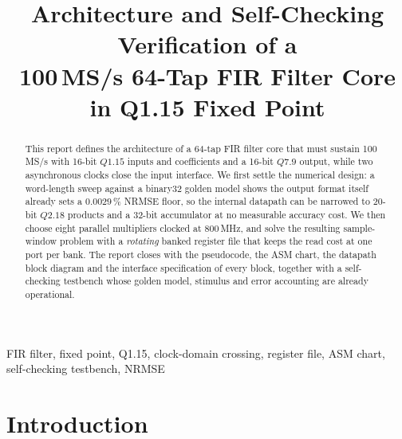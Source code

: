\documentclass[conference]{IEEEtran}
\newcommand{\qf}[2]{Q#1.#2}
\begin{document}
\title{Architecture and Self-Checking Verification of a\\
100\,MS/s 64-Tap FIR Filter Core in Q1.15 Fixed Point}

\author{
}

\maketitle

\begin{abstract}
This report defines the architecture of a 64-tap FIR filter core that must
sustain 100\,MS/s with 16-bit $\qf{1}{15}$ inputs and coefficients and a 16-bit
$\qf{7}{9}$ output, while two asynchronous clocks close the input interface.
We first settle the numerical design: a word-length sweep against a
binary32 golden model shows the output format itself already sets a
$0.0029\,\%$ NRMSE floor, so the internal datapath can be narrowed to 20-bit
$\qf{2}{18}$ products and a 32-bit accumulator at no measurable accuracy cost.
We then choose eight parallel multipliers clocked at 800\,MHz, and solve the
resulting sample-window problem with a \emph{rotating} banked register file
that keeps the read cost at one port per bank.
The report closes with the pseudocode, the ASM chart, the datapath block
diagram and the interface specification of every block, together with a
self-checking testbench whose golden model, stimulus and error accounting are
already operational.
\end{abstract}

\begin{IEEEkeywords}
FIR filter, fixed point, Q1.15, clock-domain crossing, register file, ASM chart,
self-checking testbench, NRMSE
\end{IEEEkeywords}

\section{Introduction}
\end{document}
